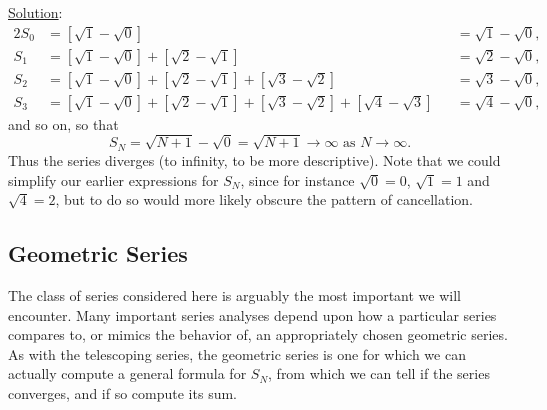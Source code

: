 \underline{Solution}:
\begin{alignat*}{2}
S_0&=\left[\sqrt1-\sqrt0\right]&&=\sqrt1-\sqrt0,\\
S_1&=\left[\sqrt1-\sqrt0\right]+\left[\sqrt2-\sqrt1\right]&&=\sqrt2-\sqrt0,\\
S_2&=\left[\sqrt1-\sqrt0\right]+\left[\sqrt2-\sqrt1\right]
   +\left[\sqrt3-\sqrt2\right]&&=\sqrt3-\sqrt0,\\
S_3&=\left[\sqrt1-\sqrt0\right]+\left[\sqrt2-\sqrt1\right]
   +\left[\sqrt3-\sqrt2\right]+\left[\sqrt4-\sqrt3\right]
   &&=\sqrt4-\sqrt0,
\end{alignat*}
and so on, so that 
$$S_N=\sqrt{N+1}-\sqrt0=\sqrt{N+1}\longrightarrow\infty
\text{ as }N\to\infty.$$
Thus the series diverges (to infinity, to be more descriptive).
\eex
Note that we could simplify our earlier expressions for $S_N$,
since for instance $\sqrt0=0$, $\sqrt1=1$ and $\sqrt4=2$, but
to do so would more likely obscure the pattern of cancellation.

\subsection{Geometric Series}
The class of series considered  here is arguably the most important
we will encounter.  Many important series analyses
depend upon how a particular series compares to, or mimics the
behavior of, an appropriately chosen geometric series.
As with the telescoping series, the geometric series
is one for which we can actually compute a general formula
for $S_N$, from which we can tell if the series converges,
and if so compute its sum.

